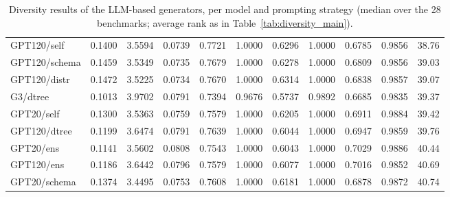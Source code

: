 \begin{table}[t]
\begin{tabular}{lrrrrrrrrrr}
GPT120/self & 0.1400 & 3.5594 & 0.0739 & 0.7721 & 1.0000 & 0.6296 & 1.0000 & 0.6785 & 0.9856 & 38.76 \\
GPT120/schema & 0.1459 & 3.5349 & 0.0735 & 0.7679 & 1.0000 & 0.6278 & 1.0000 & 0.6809 & 0.9856 & 39.03 \\
GPT120/distr & 0.1472 & 3.5225 & 0.0734 & 0.7670 & 1.0000 & 0.6314 & 1.0000 & 0.6838 & 0.9857 & 39.07 \\
G3/dtree & 0.1013 & 3.9702 & 0.0791 & 0.7394 & 0.9676 & 0.5737 & 0.9892 & 0.6685 & 0.9835 & 39.37 \\
GPT20/self & 0.1300 & 3.5363 & 0.0759 & 0.7579 & 1.0000 & 0.6205 & 1.0000 & 0.6911 & 0.9884 & 39.42 \\
GPT120/dtree & 0.1199 & 3.6474 & 0.0791 & 0.7639 & 1.0000 & 0.6044 & 1.0000 & 0.6947 & 0.9859 & 39.76 \\
GPT20/ens & 0.1141 & 3.5602 & 0.0808 & 0.7543 & 1.0000 & 0.6043 & 1.0000 & 0.7029 & 0.9886 & 40.44 \\
GPT120/ens & 0.1186 & 3.6442 & 0.0796 & 0.7579 & 1.0000 & 0.6077 & 1.0000 & 0.7016 & 0.9852 & 40.69 \\
GPT20/schema & 0.1374 & 3.4495 & 0.0753 & 0.7608 & 1.0000 & 0.6181 & 1.0000 & 0.6878 & 0.9872 & 40.74 \\
\bottomrule
\end{tabular}
\caption{Diversity results of the LLM-based generators, per model and prompting strategy (median over the 28 benchmarks; average rank as in Table~\ref{tab:diversity_main}).}
\label{tab:diversity_llm}
\end{table}